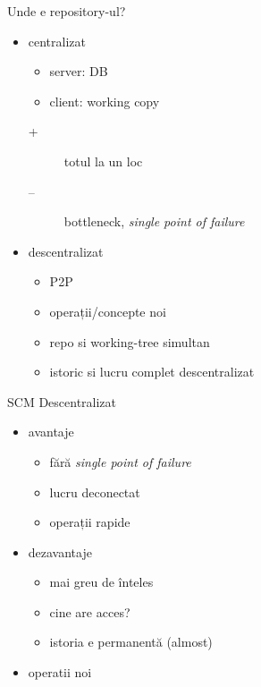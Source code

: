 \documentclass{beamer}
\begin{document}
\begin{frame}{Unde e repository-ul?}
  \begin{itemize}
    \item centralizat
      \begin{itemize}
        \item server: DB
        \item client: working copy
      \end{itemize}
      \pause
      \begin{description}
        \item[+] totul la un loc
        \item[--] bottleneck, \textit{single point of failure}
      \end{description}
    \pause
    \item descentralizat
      \begin{itemize}
        \item P2P
        \item operații/concepte noi
        \item repo si working-tree simultan
        \item istoric si lucru complet descentralizat
      \end{itemize}
  \end{itemize}
\end{frame}

\begin{frame}{SCM Descentralizat}
  \begin{itemize}
    \item avantaje
      \begin{itemize}
        \item fără \textit{single point of failure}
        \item lucru deconectat
        \item operații rapide
      \end{itemize}
    \pause
    \item dezavantaje
      \begin{itemize}
        \item mai greu de înteles
        \item cine are acces?
        \item istoria e permanentă (almost)
      \end{itemize}
    \pause
    \item operatii noi
  \end{itemize}
\end{frame}
\end{document}
